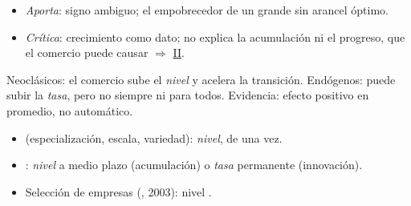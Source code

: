 \documentclass{article}
\begin{document}
\begin{columnas}
\begin{itemize}
\item \emph{Aporta}: signo ambiguo; el empobrecedor de un grande sin arancel óptimo.
\item \emph{Crítica}: crecimiento como dato; no explica la acumulación ni el progreso, que el comercio puede causar $\Rightarrow$ \hyperref[rep:II]{II}.
\end{itemize}

\begin{ideaclave}
Neoclásicos: el comercio sube el \emph{nivel} y acelera la transición. Endógenos: puede subir la \emph{tasa}, pero no siempre ni para todos. Evidencia: efecto positivo en promedio, no automático.
\end{ideaclave}
\begin{itemize}
\item {} (especialización, escala, variedad): \emph{nivel}, de una vez.
\item {}: \emph{nivel} a medio plazo (acumulación) o \emph{tasa} permanente (innovación).
\item Selección de empresas (, 2003): nivel .
\end{itemize}


\end{columnas}
\end{document}
